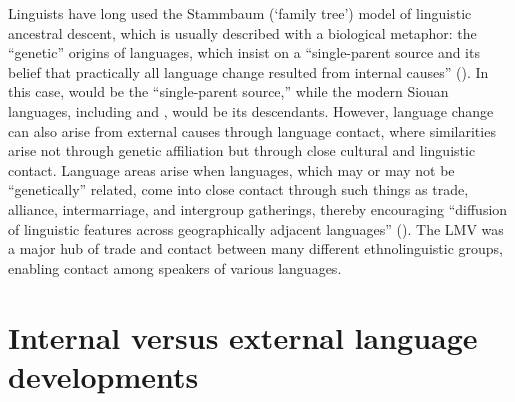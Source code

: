 \documentclass[output=paper]{LSP/langsci}
\begin{document}
Linguists have long used the Stammbaum (`family tree') model of linguistic ancestral descent, which is usually described with a biological metaphor: the “genetic” origins of languages, which insist on a “single-parent source and its belief that practically all language change resulted from internal causes” (\citealt[7]{Winford2003}). In this case,  would be the “single-parent source,” while the modern Siouan languages, including  and , would be its descendants. However, language change can also arise from external causes through language contact, where similarities arise not through genetic affiliation but through close cultural and linguistic contact. Language areas arise when languages, which may or may not be “genetically” related, come into close contact through such things as trade, alliance, intermarriage, and intergroup gatherings, thereby encouraging “diffusion of linguistic features across geographically adjacent languages” (\citealt[7]{Winford2003}). The LMV was a major hub of trade and contact between many different ethnolinguistic groups, enabling contact among speakers of various languages. 

\section{Internal versus external language developments}
\end{document}
